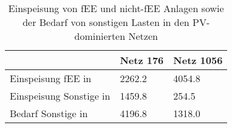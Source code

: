 {
\renewcommand{\arraystretch}{1.2}%
\begin{table}[H]
	\begin{center}
		\caption{Einspeisung von fEE und nicht-fEE Anlagen sowie der Bedarf von sonstigen Lasten in den PV-dominierten Netzen}
		\begin{tabu} to 0.7\textwidth {X[2] X[1, r] X[1, r]}
			\toprule
											  & Netz \num{176} & Netz \num{1056} \\ \midrule
			Einspeisung fEE in \si{\mwh}      & \num{2262.2}   & \num{4054.8}    \\
			Einspeisung Sonstige in \si{\mwh} & \num{1459.8}   & \num{254.5}     \\
			Bedarf Sonstige  in \si{\mwh}     & \num{4196.8}   & \num{1318.0}    \\ \bottomrule
		\end{tabu}
		\label{tab:pv_dominated_week_a_char}
	\end{center}
	\vspace{-3mm}%
\end{table}
}
